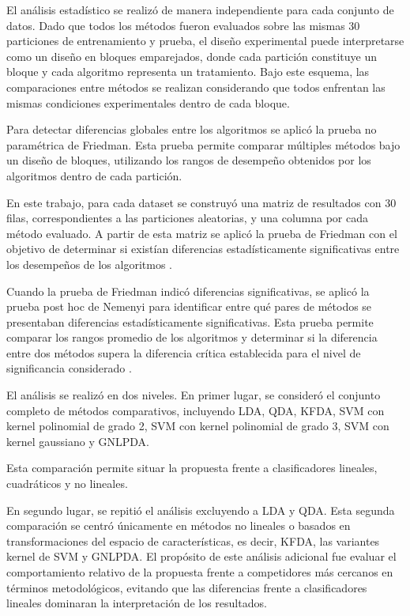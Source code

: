 El análisis estadístico se realizó de manera independiente para cada conjunto de datos. Dado que todos los métodos fueron evaluados sobre las mismas 30 particiones de entrenamiento y prueba, el diseño experimental puede interpretarse como un diseño en bloques emparejados, donde cada partición constituye un bloque y cada algoritmo representa un tratamiento. Bajo este esquema, las comparaciones entre métodos se realizan considerando que todos enfrentan las mismas condiciones experimentales dentro de cada bloque.

Para detectar diferencias globales entre los algoritmos se aplicó la prueba no paramétrica de Friedman. Esta prueba permite comparar múltiples métodos bajo un diseño de bloques, utilizando los rangos de desempeño obtenidos por los algoritmos dentro de cada partición.

En este trabajo, para cada dataset se construyó una matriz de resultados con 30 filas, correspondientes a las particiones aleatorias, y una columna por cada método evaluado. A partir de esta matriz se aplicó la prueba de Friedman con el objetivo de determinar si existían diferencias estadísticamente significativas entre los desempeños de los algoritmos \cite{pereira2015overview}.

Cuando la prueba de Friedman indicó diferencias significativas, se aplicó la prueba post hoc de Nemenyi para identificar entre qué pares de métodos se presentaban diferencias estadísticamente significativas. Esta prueba permite comparar los rangos promedio de los algoritmos y determinar si la diferencia entre dos métodos supera la diferencia crítica establecida para el nivel de significancia considerado \cite{demvsar2006statistical}.

El análisis se realizó en dos niveles. En primer lugar, se consideró el conjunto completo de métodos comparativos, incluyendo LDA, QDA, KFDA, SVM con kernel polinomial de grado 2, SVM con kernel polinomial de grado 3, SVM con kernel gaussiano y GNLPDA.

Esta comparación permite situar la propuesta frente a clasificadores lineales, cuadráticos y no lineales.

En segundo lugar, se repitió el análisis excluyendo a LDA y QDA. Esta segunda comparación se centró únicamente en métodos no lineales o basados en transformaciones del espacio de características, es decir, KFDA, las variantes kernel de SVM y GNLPDA. El propósito de este análisis adicional fue evaluar el comportamiento relativo de la propuesta frente a competidores más cercanos en términos metodológicos, evitando que las diferencias frente a clasificadores lineales dominaran la interpretación de los resultados.

